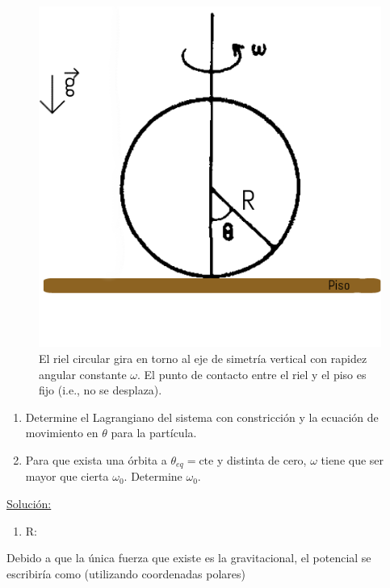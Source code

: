 \documentclass[a4paper,10pt]{article}
\numberwithin{equation}{section}
\begin{document}
\begin{figure}[H]
 \center 
 \includegraphics[scale=0.5]{fig2}
 \caption{El riel circular gira en torno al eje de simetría vertical con rapidez 
 angular constante $\omega$. El punto de contacto entre el riel y el piso es 
 fijo (i.e., no se desplaza).}
\end{figure}

\begin{enumerate}[label=\alph*)]
 \item Determine el Lagrangiano del sistema con constricción y la ecuación de movimiento 
 en $\theta$ para la partícula.
 \item Para que exista una órbita a $\theta_{eq}= \text{cte}$ y distinta de cero, $\omega$
 tiene que ser mayor que cierta $\omega_0$. Determine $\omega_0$.
\end{enumerate}

\vspace{.3cm}

\underline{Solución:} \vspace{.3cm}

\begin{enumerate}[label=\alph*)]
 \item R:
\end{enumerate}

Debido a que la única fuerza que existe es la gravitacional, el potencial se 
escribiría como (utilizando coordenadas polares)
\end{document}
